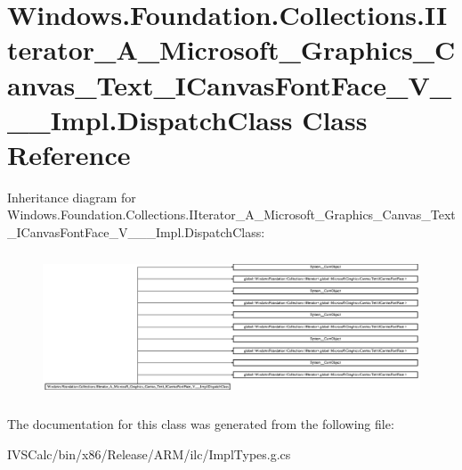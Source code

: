 \hypertarget{class_windows_1_1_foundation_1_1_collections_1_1_i_iterator___a___microsoft___graphics___canvas_85a3a185fbf4af89de77c42b9a3467c1}{}\section{Windows.\+Foundation.\+Collections.\+I\+Iterator\+\_\+\+A\+\_\+\+Microsoft\+\_\+\+Graphics\+\_\+\+Canvas\+\_\+\+Text\+\_\+\+I\+Canvas\+Font\+Face\+\_\+\+V\+\_\+\+\_\+\+\_\+\+Impl.\+Dispatch\+Class Class Reference}
\label{class_windows_1_1_foundation_1_1_collections_1_1_i_iterator___a___microsoft___graphics___canvas_85a3a185fbf4af89de77c42b9a3467c1}
Inheritance diagram for Windows.\+Foundation.\+Collections.\+I\+Iterator\+\_\+\+A\+\_\+\+Microsoft\+\_\+\+Graphics\+\_\+\+Canvas\+\_\+\+Text\+\_\+\+I\+Canvas\+Font\+Face\+\_\+\+V\+\_\+\+\_\+\+\_\+\+Impl.\+Dispatch\+Class\+:\begin{figure}[H]
\begin{center}
\leavevmode
\includegraphics[height=4.313725cm]{class_windows_1_1_foundation_1_1_collections_1_1_i_iterator___a___microsoft___graphics___canvas_85a3a185fbf4af89de77c42b9a3467c1}
\end{center}
\end{figure}


The documentation for this class was generated from the following file\+:\begin{DoxyCompactItemize}
\item 
I\+V\+S\+Calc/bin/x86/\+Release/\+A\+R\+M/ilc/Impl\+Types.\+g.\+cs\end{DoxyCompactItemize}
